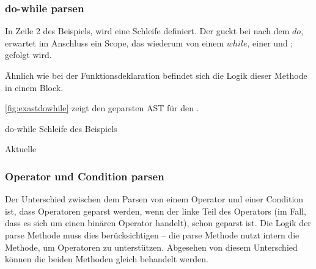 {{    %
    \subsubsection{do-while parsen}
    \label{sssec:do-while parsen}
      In Zeile 2 des Beispiels, wird eine  Schleife definiert. Der  guckt bei  nach dem \myRIn$do$, erwartet im Anschluss ein Scope, das wiederum von einem \myRIn$while$, einer  und \myRIn$;$ gefolgt wird.

      Ähnlich wie bei der Funktionsdeklaration befindet sich die Logik dieser Methode in einem  Block.

      \autoref{fig:exastdowhile} zeigt den geparsten AST für den .
      \begin{paracol}{2}
        \begin{myCodeEnv}
          \centering
          \begin{myInvBox}[width=.9\linewidth]
            
          \end{myInvBox}
          \caption{do-while Schleife des Beispiels}
          \label{fig:exastdowhile}
        \end{myCodeEnv}
        \switchcolumn
        \begin{myCodeEnv}
          \centering
          \begin{myInvBox}[width=.9\linewidth]
            
          \end{myInvBox}
          \caption*{Aktuelle }
        \end{myCodeEnv}
      \end{paracol}


    \subsubsection{Operator und Condition parsen}
    \label{sssec:Operator und Condition parsen}
      Der Unterschied zwischen dem Parsen von einem Operator und einer Condition ist, dass Operatoren geparst werden, wenn der linke Teil des Operators (im Fall, dass es sich um einen binären Operator handelt), schon geparst ist. Die Logik der  parse Methode muss dies berücksichtigen -- die  parse Methode nutzt intern die  Methode, um Operatoren zu unterstützen. Abgesehen von diesem Unterschied können die beiden Methoden gleich behandelt werden.

}}
